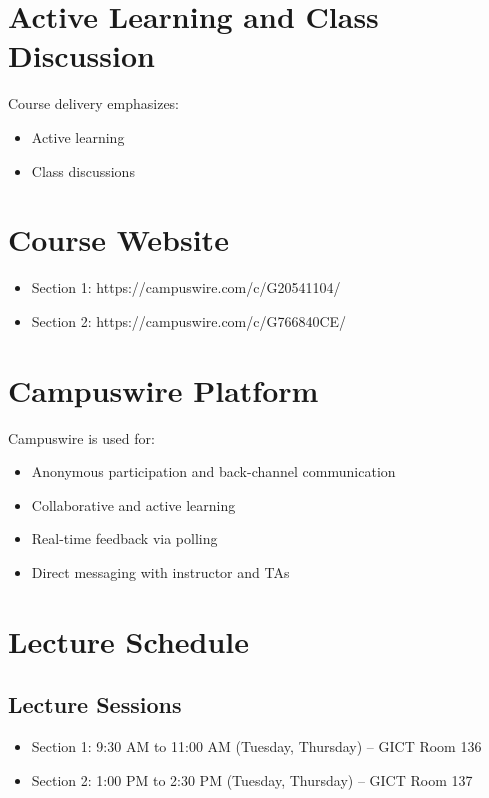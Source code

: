 \documentclass[12pt]{article}
\begin{document}
\section*{Active Learning and Class Discussion}

Course delivery emphasizes:
\begin{itemize}
\item Active learning
\item Class discussions
\end{itemize}

\section*{Course Website}

\begin{itemize}
\item Section 1: https://campuswire.com/c/G20541104/
\item Section 2: https://campuswire.com/c/G766840CE/
\end{itemize}

\section*{Campuswire Platform}

Campuswire is used for:

\begin{itemize}
\item Anonymous participation and back-channel communication
\item Collaborative and active learning
\item Real-time feedback via polling
\item Direct messaging with instructor and TAs
\end{itemize}

\section*{Lecture Schedule}

\subsection*{Lecture Sessions}

\begin{itemize}
\item Section 1: 9:30 AM to 11:00 AM (Tuesday, Thursday) -- GICT Room 136
\item Section 2: 1:00 PM to 2:30 PM (Tuesday, Thursday) -- GICT Room 137
\end{itemize}
\end{document}
